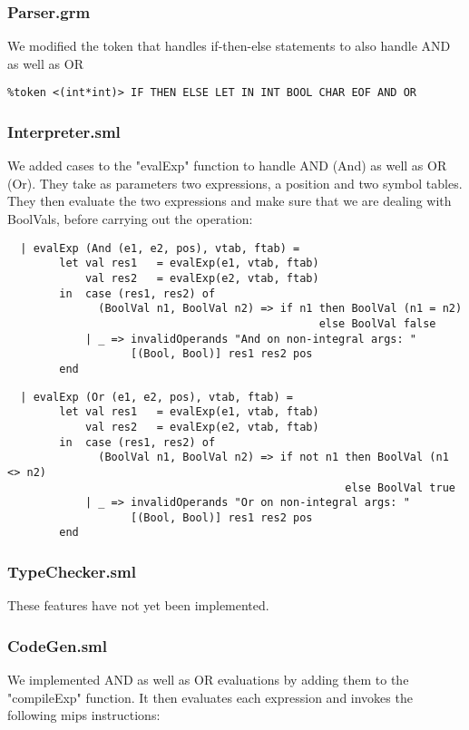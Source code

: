 \documentclass[12pt]{article}
\begin{document}
\subsubsection{Parser.grm}
We modified the token that handles if-then-else statements to also handle AND as well as OR
\begin{verbatim}
%token <(int*int)> IF THEN ELSE LET IN INT BOOL CHAR EOF AND OR
\end{verbatim}

\subsubsection{Interpreter.sml}
We added cases to the "evalExp" function to handle AND (And) as well as OR (Or). They take as parameters two expressions, a position and two symbol tables. They then evaluate the two expressions and make sure that we are dealing with BoolVals, before carrying out the operation:

\begin{verbatim}
  | evalExp (And (e1, e2, pos), vtab, ftab) =
        let val res1   = evalExp(e1, vtab, ftab)
            val res2   = evalExp(e2, vtab, ftab)
        in  case (res1, res2) of
              (BoolVal n1, BoolVal n2) => if n1 then BoolVal (n1 = n2) 
                                                else BoolVal false
            | _ => invalidOperands "And on non-integral args: "
                   [(Bool, Bool)] res1 res2 pos
        end
\end{verbatim}
\clearpage
\begin{verbatim}
  | evalExp (Or (e1, e2, pos), vtab, ftab) =
        let val res1   = evalExp(e1, vtab, ftab)
            val res2   = evalExp(e2, vtab, ftab)
        in  case (res1, res2) of
              (BoolVal n1, BoolVal n2) => if not n1 then BoolVal (n1 <> n2) 
                                                    else BoolVal true
            | _ => invalidOperands "Or on non-integral args: " 
                   [(Bool, Bool)] res1 res2 pos
        end
\end{verbatim}

\subsubsection{TypeChecker.sml}
These features have not yet been implemented.

\subsubsection{CodeGen.sml}
We implemented AND as well as OR evaluations by adding them to the "compileExp" function. It then evaluates each expression and invokes the following mips instructions:
\end{document}
